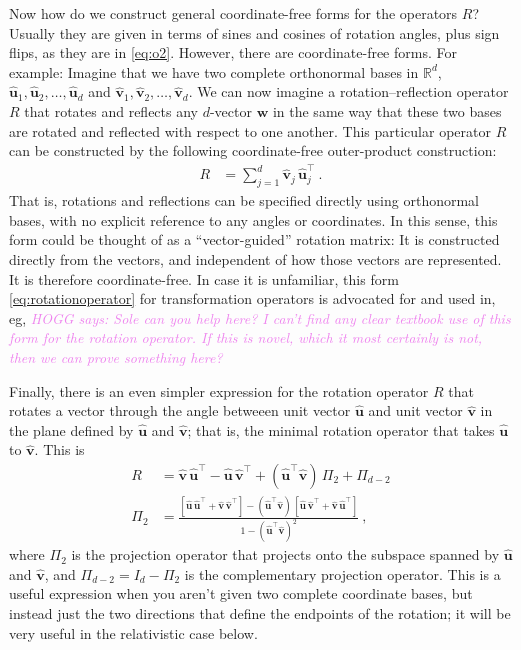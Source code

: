 \documentclass{article}
\newcommand{\proj}{\mathsf{\Pi}}
\newcommand{\Evec}[1]{{\mathbf{#1}}} %
\newcommand{\Ehat}[1]{{\mathbf{\hat{#1}}}} %
\newcommand{\HOGG}[1]{\textcolor{violet}{\textsl{HOGG says: {#1}}}}
\begin{document}
Now how do we construct general coordinate-free forms for the operators $R$?
Usually they are given in terms of sines and cosines of rotation angles, plus sign flips, as they are in \eqref{eq:o2}.
However, there are coordinate-free forms.
For example: Imagine that we have two complete orthonormal bases in $\mathbb{R}^d$, $\Ehat{u}_1,\Ehat{u}_2,\ldots,\Ehat{u}_d$ and $\Ehat{v}_1,\Ehat{v}_2,\ldots,\Ehat{v}_d$.
We can now imagine a rotation--reflection operator $R$ that rotates and reflects any $d$-vector $\Evec{w}$ in the same way that these two bases are rotated and reflected with respect to one another.
This particular operator $R$ can be constructed by the following coordinate-free outer-product construction:
\begin{align}
    R &= \sum_{j=1}^d \Ehat{v}_j\,\Ehat{u}_j^\top ~.\label{eq:rotationoperator}
\end{align}
That is, rotations and reflections can be specified directly using orthonormal bases, with no explicit reference to any angles or coordinates.
In this sense, this form could be thought of as a ``vector-guided'' rotation matrix:
It is constructed directly from the vectors, and independent of how those vectors are represented.
It is therefore coordinate-free.
In case it is unfamiliar, this form \eqref{eq:rotationoperator} for transformation operators is advocated for and used in, eg, \HOGG{Sole can you help here? I can't find any clear textbook use of this form for the rotation operator. If this is novel, which it most certainly is not, then we can prove something here?}

Finally, there is an even simpler expression for the rotation operator $R$ that rotates a vector through the angle betweeen unit vector $\Ehat{u}$ and unit vector $\Ehat{v}$ in the plane defined by $\Ehat{u}$ and $\Ehat{v}$; that is, the minimal rotation operator that takes $\Ehat{u}$ to $\Ehat{v}$.
This is
\begin{align}
    R &= \Ehat{v}\,\Ehat{u}^\top - \Ehat{u}\,\Ehat{v}^\top + (\Ehat{u}^\top\Ehat{v})\,\proj_{2} + \proj_{d-2} \label{eq:vecs2rot} \\
    \proj_2 &= \frac{[\Ehat{u}\,\Ehat{u}^\top + \Ehat{v}\,\Ehat{v}^\top] - (\Ehat{u}^\top\Ehat{v})\,[\Ehat{u}\,\Ehat{v}^\top + \Ehat{v}\,\Ehat{u}^\top]}{1 - (\Ehat{u}^\top\Ehat{v})^2} ~,
\end{align}
where $\proj_2$ is the projection operator that projects onto the subspace spanned by $\Ehat{u}$ and $\Ehat{v}$, and $\proj_{d-2} = I_d - \proj_2$ is the complementary projection operator.
This is a useful expression when you aren't given two complete coordinate bases, but instead just the two directions that define the endpoints of the rotation; it will be very useful in the relativistic case below.
\end{document}
